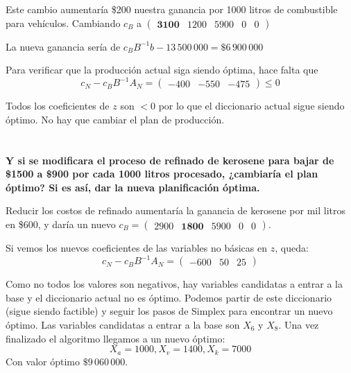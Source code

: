 \documentclass[10pt,a4paper]{article}
\begin{document}
	\vspace{5mm}
	
	Este cambio aumentaría \$200 nuestra ganancia por 1000 litros de combustible para vehículos. Cambiando $c_B$ a $\begin{pmatrix} \textbf{3100} & 1200 & 5900 & 0 & 0\end{pmatrix}$
	
	La nueva ganancia sería de $c_B B^{-1} b - 13\,500\,000 = \$6\,900\,000$
	
	Para verificar que la producción actual siga siendo óptima, hace falta que
	\[
	c_N - c_B B^{-1} A_N = \begin{pmatrix} -400 & -550 & -475 \end{pmatrix} \leq 0
	\]
	
	Todos los coeficientes de $z$ son $< 0$ por lo que el diccionario actual sigue siendo óptimo. No hay que cambiar el plan de producción.
	
	\section{} %
	\textbf{Y si se modificara el proceso de refinado de kerosene para bajar de \$1500 a \$900 por cada 1000 litros procesado, ¿cambiaría el plan óptimo? Si es así, dar la nueva planificación óptima.}
	
	\vspace{5mm}
	
	Reducir los costos de refinado aumentaría la ganancia de kerosene por mil litros en \$600, y daría un nuevo $c_B = \begin{pmatrix}
		2900 & \textbf{1800} & 5900 & 0 & 0
	\end{pmatrix}$.
	
	Si vemos los nuevos coeficientes de las variables no básicas en $z$, queda:
	\[
	c_N - c_B B^{-1} A_N = \begin{pmatrix}
		-600 & 50 & 25
	\end{pmatrix}
	\]
	
	Como no todos los valores son negativos, hay variables candidatas a entrar a la base y el diccionario actual no es óptimo. Podemos partir de este diccionario (sigue siendo factible) y seguir los pasos de Simplex para encontrar un nuevo óptimo. Las variables candidatas a entrar a la base son $X_6$ y $X_8$.
	Una vez finalizado el algoritmo llegamos a un nuevo óptimo:  $$X_a = 1000, X_v = 1400,  X_k = 7000$$
	Con valor óptimo $\$9\,060\,000$.
	
\end{document}
